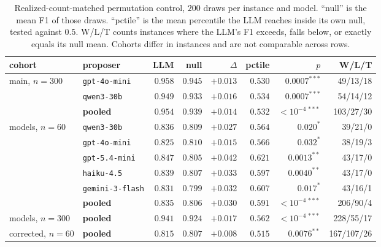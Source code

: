 \documentclass{article}
\begin{document}
\begin{table}[h]
\caption{Realized-count-matched permutation control, $200$ draws per instance and model. ``null''
is the mean F1 of those draws. ``pctile'' is the mean percentile the LLM reaches inside its own
null, tested against $0.5$. W/L/T counts instances where the LLM's F1 exceeds, falls below, or
exactly equals its null mean. Cohorts differ in instances and are not comparable across rows.}
\label{tab:perm}
\centering
\small
\setlength{\tabcolsep}{4pt}
\begin{tabular}{llrrrrrr}
\toprule
cohort & proposer & LLM & null & $\Delta$ & pctile & $p$ & W/L/T \\
\midrule
main, $n{=}300$ & \texttt{gpt-4o-mini} & $0.958$ & $0.945$ & $+0.013$ & $0.530$ & $0.0007^{***}$ & 49/13/18 \\
                & \texttt{qwen3-30b}   & $0.949$ & $0.933$ & $+0.016$ & $0.534$ & $0.0007^{***}$ & 54/14/12 \\
                & \textbf{pooled}      & $0.954$ & $0.939$ & $+0.014$ & $0.532$ & $<10^{-4\,***}$ & 103/27/30 \\
\midrule
models, $n{=}60$ & \texttt{qwen3-30b}     & $0.836$ & $0.809$ & $+0.027$ & $0.564$ & $0.020^{*}$ & 39/21/0 \\
                 & \texttt{gpt-4o-mini}   & $0.825$ & $0.810$ & $+0.015$ & $0.566$ & $0.032^{*}$ & 38/19/3 \\
                 & \texttt{gpt-5.4-mini}  & $0.847$ & $0.805$ & $+0.042$ & $0.621$ & $0.0013^{**}$ & 43/17/0 \\
                 & \texttt{haiku-4.5}     & $0.839$ & $0.807$ & $+0.033$ & $0.597$ & $0.0040^{**}$ & 43/17/0 \\
                 & \texttt{gemini-3-flash}& $0.831$ & $0.799$ & $+0.032$ & $0.607$ & $0.017^{*}$ & 43/16/1 \\
                 & \textbf{pooled}        & $0.835$ & $0.806$ & $+0.030$ & $0.591$ & $<10^{-4\,***}$ & 206/90/4 \\
\midrule
models, $n{=}300$ & \textbf{pooled}       & $0.941$ & $0.924$ & $+0.017$ & $0.562$ & $<10^{-4\,***}$ & 228/55/17 \\
\midrule
corrected, $n{=}60$ & \textbf{pooled} & $0.815$ & $0.807$ & $+0.008$ & $0.515$ & $0.0076^{**}$ & 167/107/26 \\
\bottomrule
\end{tabular}
\end{table}
\end{document}
